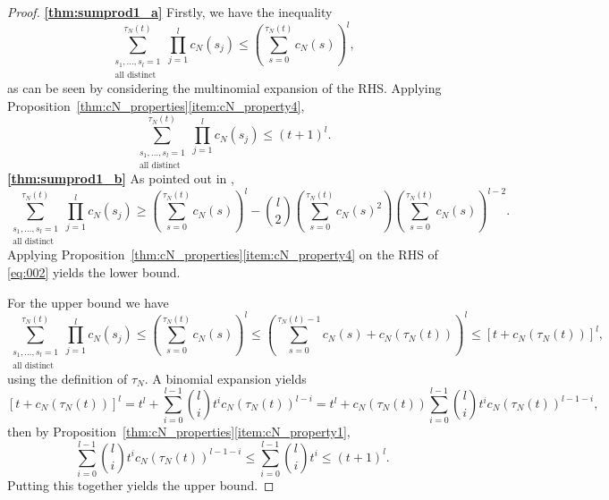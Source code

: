 \begin{proof} \textbf{\ref{thm:sumprod1_a}}
Firstly, we have the inequality
\begin{equation*}
\sum_{\substack{ s_1, \dots, s_l =1 \\ \text{all distinct} }}^{\tau_N(t)}
        \prod_{j=1}^l c_N(s_j)
\leq \left( \sum_{s=0}^{\tau_N(t)} c_N(s) \right)^l ,
\end{equation*}
as can be seen by considering the multinomial expansion of the RHS.
Applying Proposition~\ref{thm:cN_properties}\ref{item:cN_property4},
\begin{equation}\label{eq:039}
\sum_{\substack{ s_1, \dots, s_l =1 \\ \text{all distinct} }}^{\tau_N(t)}
        \prod_{j=1}^l c_N(s_j)
\leq (t+1)^l .
\end{equation}
\textbf{\ref{thm:sumprod1_b}}
As pointed out in \textcite[Equation (8)]{koskela2018}, 
\begin{equation}\label{eq:002}
\sum_{\substack{ s_1, \dots, s_l =1 \\ \text{all distinct} }}^{\tau_N(t)} 
        \prod_{j=1}^l c_N(s_j)
\geq \left( \sum_{s=0}^{\tau_N(t)} c_N(s) \right)^l
        - \binom{l}{2} \left( \sum_{s=0}^{\tau_N(t)} c_N(s)^2 \right)
        \left( \sum_{s=0}^{\tau_N(t)} c_N(s) \right)^{l-2} .
\end{equation}
Applying Proposition~\ref{thm:cN_properties}\ref{item:cN_property4} on the RHS of \eqref{eq:002} yields the lower bound.

For the upper bound we have
\begin{equation*}
\sum_{\substack{ s_1, \dots, s_l =1 \\ \text{all distinct} }}^{\tau_N(t)} 
        \prod_{j=1}^l c_N(s_j)
\leq \left( \sum_{s=0}^{\tau_N(t)} c_N(s) \right)^l
\leq \left( \sum_{s=0}^{\tau_N(t) -1} c_N(s) + c_N(\tau_N(t)) \right)^l
\leq \left[ t + c_N(\tau_N(t)) \right]^l ,
\end{equation*}
using the definition of $\tau_N$.
A binomial expansion yields
\begin{equation*}
\left[ t + c_N(\tau_N(t)) \right]^l
= t^l + \sum_{i=0}^{l-1} \binom{l}{i} t^i c_N(\tau_N(t))^{l-i}
= t^l + c_N(\tau_N(t)) \sum_{i=0}^{l-1} \binom{l}{i} t^i c_N(\tau_N(t))^{l-1-i} ,
\end{equation*}
then by Proposition~\ref{thm:cN_properties}\ref{item:cN_property1},
\begin{equation*}
\sum_{i=0}^{l-1} \binom{l}{i} t^i c_N(\tau_N(t))^{l-1-i}
\leq \sum_{i=0}^{l-1} \binom{l}{i} t^i
\leq (t+1)^l .
\end{equation*}
Putting this together yields the upper bound.
\end{proof}


